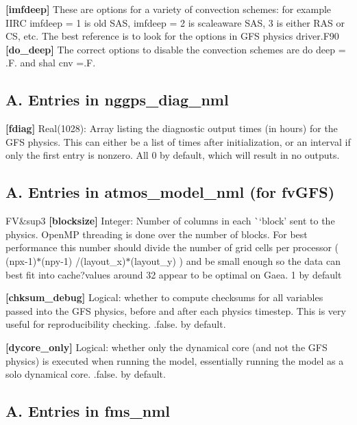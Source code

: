 {\bfseries \mbox{[}imfdeep\mbox{]}} These are options for a variety of convection schemes\+: for example I\+I\+RC imfdeep = 1 is old S\+AS, imfdeep = 2 is scaleaware S\+AS, 3 is either R\+AS or CS, etc. The best reference is to look for the options in G\+FS physics driver.\+F90 ~\newline
 {\bfseries \mbox{[}do\+\_\+deep\mbox{]}} The correct options to disable the convection schemes are do deep = .F. and shal cnv =.F.

\subsection*{A. Entries in nggps\+\_\+diag\+\_\+nml}

{\bfseries \mbox{[}fdiag\mbox{]}} Real(1028)\+: Array listing the diagnostic output times (in hours) for the G\+FS physics. This can either be a list of times after initialization, or an interval if only the first entry is nonzero. All 0 by default, which will result in no outputs.

\subsection*{A. Entries in atmos\+\_\+model\+\_\+nml (for fv\+G\+FS)}

FV\&sup3 {\bfseries \mbox{[}blocksize\mbox{]}} Integer\+: Number of columns in each \`{}`block'\textquotesingle{} sent to the physics. Open\+MP threading is done over the number of blocks. For best performance this number should divide the number of grid cells per processor ( (npx-\/1)$\ast$(npy-\/1) /(layout\+\_\+x)$\ast$(layout\+\_\+y) ) and be small enough so the data can best fit into cache?values around 32 appear to be optimal on Gaea. 1 by default

{\bfseries \mbox{[}chksum\+\_\+debug\mbox{]}} Logical\+: whether to compute checksums for all variables passed into the G\+FS physics, before and after each physics timestep. This is very useful for reproducibility checking. .false. by default.

{\bfseries \mbox{[}dycore\+\_\+only\mbox{]}} Logical\+: whether only the dynamical core (and not the G\+FS physics) is executed when running the model, essentially running the model as a solo dynamical core. .false. by default.

\subsection*{A. Entries in fms\+\_\+nml}

